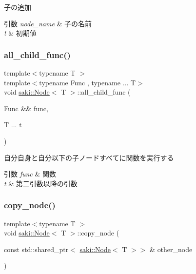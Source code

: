 子の追加 


\begin{DoxyParams}{引数}
{\em node\+\_\+name} & 子の名前 \\
\hline
{\em t} & 初期値 \\
\hline
\end{DoxyParams}
\mbox{\label{classsaki_1_1_node_aad51acc43e01039b19d22f4f09689f3b}} 
\subsubsection{\texorpdfstring{all\+\_\+child\+\_\+func()}{all\_child\_func()}}
{\footnotesize\ttfamily template$<$typename T $>$ \\
template$<$typename Func , typename ... T$>$ \\
void \mbox{\hyperlink{classsaki_1_1_node}{saki\+::\+Node}}$<$ T $>$\+::all\+\_\+child\+\_\+func (\begin{DoxyParamCaption}\item[{Func \&\&}]{func,  }\item[{T ...}]{t }\end{DoxyParamCaption})\hspace{0.3cm}{\ttfamily [inline]}}



自分自身と自分以下の子ノードすべてに関数を実行する 


\begin{DoxyParams}{引数}
{\em func} & 関数 \\
\hline
{\em t} & 第二引数以降の引数 \\
\hline
\end{DoxyParams}
\mbox{\label{classsaki_1_1_node_abadf381e5eb35263032f833d695be89b}} 
\subsubsection{\texorpdfstring{copy\+\_\+node()}{copy\_node()}}
{\footnotesize\ttfamily template$<$typename T $>$ \\
void \mbox{\hyperlink{classsaki_1_1_node}{saki\+::\+Node}}$<$ T $>$\+::copy\+\_\+node (\begin{DoxyParamCaption}\item[{const std\+::shared\+\_\+ptr$<$ \mbox{\hyperlink{classsaki_1_1_node}{saki\+::\+Node}}$<$ T $>$$>$ \&}]{other\+\_\+node }\end{DoxyParamCaption})\hspace{0.3cm}{\ttfamily [inline]}}



